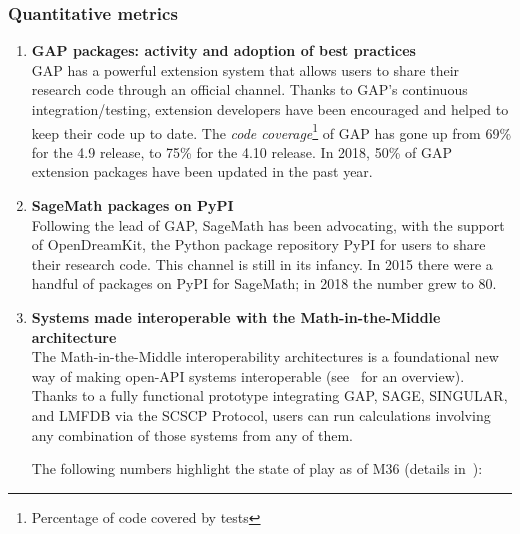 \subsubsection{Quantitative metrics}

\begin{enumerate}
\item \textbf{GAP packages: activity and adoption of best practices}\\
  GAP has a powerful extension system that allows users to share their
  research code through an official channel. Thanks to GAP's
  continuous integration/testing, extension developers have been
  encouraged and helped to keep their code up to date. The \emph{code
    coverage}\footnote{Percentage of code covered by tests} of GAP has
  gone up from 69\% for the 4.9 release, to 75\% for the 4.10 release.
  In 2018, 50\% of GAP extension packages have been updated in the
  past year.
\item \textbf{SageMath packages on PyPI}\\
  Following the lead of GAP, SageMath has been advocating, with the
  support of OpenDreamKit, the Python package repository PyPI for
  users to share their research code. This channel is still in its
  infancy. In 2015 there were a handful of packages on PyPI for
  SageMath; in 2018 the number grew to 80.
\item \textbf{Systems made interoperable with the Math-in-the-Middle architecture}\\

  The Math-in-the-Middle interoperability architectures is a
  foundational new way of making open-API systems interoperable
  (see~\cite{ODK-D6.5} for an overview). Thanks to a fully functional
  prototype integrating GAP, SAGE, SINGULAR, and LMFDB via the SCSCP
  Protocol, users can run calculations involving any combination of
  those systems from any of them.

  The following numbers highlight the state of play as of M36 (details in~\cite{ODK-D6.8}):


\end{enumerate}
